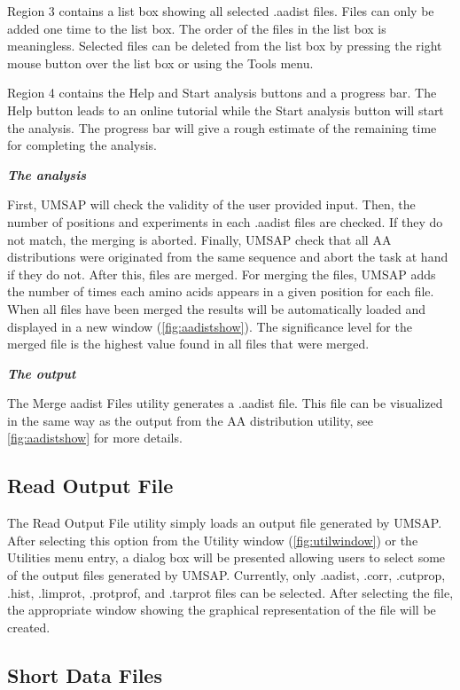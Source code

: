 Region \num{3} contains a list box showing all selected .aadist files. Files can only be added one time to the list box. The order of the files in the list box is meaningless. Selected files can be deleted from the list box by pressing the right mouse button over the list box or using the Tools menu. 

Region \num{4} contains the Help and Start analysis buttons and a progress bar. The Help button leads to an online tutorial while the Start analysis button will start the analysis. The progress bar will give a rough estimate of the remaining time for completing the analysis.

\textit{\textbf{The analysis}}

First, UMSAP will check the validity of the user provided input. Then, the number of positions and experiments in each .aadist files are checked. If they do not match, the merging is aborted. Finally, UMSAP check that all AA distributions were originated from the same sequence and abort the task at hand if they do not. After this, files are merged. For merging the files, UMSAP adds the number of times each amino acids appears in a given position for each file. When all files have been merged the results will be automatically loaded and displayed in a new window (\autoref{fig:aadistshow}). The significance level for the merged file is the highest value found in all files that were merged.

\textit{\textbf{The output}} 

The Merge aadist Files utility generates a .aadist file. This file can be visualized in the same way as the output from the AA distribution utility, see \autoref{fig:aadistshow} for more details.

\subsection{Read Output File}
\label{subsec:readOutF}

The Read Output File utility simply loads an output file generated by UMSAP. After selecting this option from the Utility window (\autoref{fig:utilwindow}) or the Utilities menu entry, a dialog box will be presented allowing users to select some of the output files generated by UMSAP. Currently, only .aadist, .corr, .cutprop, .hist, .limprot, .protprof, and .tarprot files can be selected. After selecting the file, the appropriate window showing the graphical representation of the file will be created. 

\subsection{Short Data Files}
\label{subsec:shortDF}


